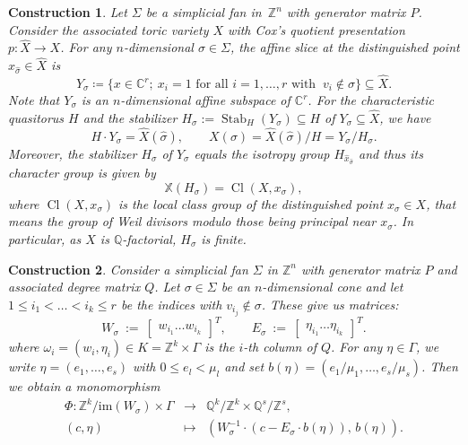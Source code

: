 \documentclass[10pt,a4paper]{amsart}
\newtheorem{construction}{Construction}
\newcommand{\C}{\mathbb{C}}
\DeclareMathOperator{\Cl}{Cl}
\newcommand{\Q}{\mathbb{Q}}
\DeclareMathOperator{\Stab}{Stab}
\newcommand{\Z}{\mathbb{Z}}
\begin{document}
\begin{construction}\label{constr:slice}
Let $\Sigma$ be a simplicial fan in~$\Z^n$ with generator
matrix $P$.
Consider the associated toric variety $X$ with Cox's quotient
presentation $p \colon \hat X \to X$.
For any $n$-dimensional $\sigma \in \Sigma$,
the \emph{affine slice} at the distinguished point
$\hat x_{\hat \sigma} \in \hat X$ is
$$
Y_\sigma
\coloneqq
\{ x \in \C^r; \ x_i=1 \text{ for all } i = 1, \ldots, r \text{ with } \  v_i \not\in \sigma \}
\subseteq
\hat X.
$$
Note that $Y_\sigma$ is an $n$-dimensional
affine subspace of $\C^r$.
For the characteristic quasitorus $H$ and the
\emph{stabilizer} $H_\sigma := \Stab_H(Y_\sigma) \subseteq H$
of $Y_\sigma \subseteq \hat X$, we have
$$
H \cdot Y_\sigma = \hat X(\hat\sigma),
\qquad
X(\sigma) = \hat X(\hat\sigma)/H = Y_\sigma/H_\sigma.
$$
Moreover, the stabilizer $H_\sigma$ of $Y_\sigma$
equals the isotropy group $H_{\hat x_{\hat \sigma}}$
and thus its character group is given by
$$
\mathbb{X}(H_\sigma) = \Cl(X,x_\sigma),
$$
where $\Cl(X,x_\sigma)$ is the local class group of the distinguished
point $x_\sigma \in X$, that means the group of Weil divisors
modulo those being principal near $x_\sigma$. In particular,
as $X$ is $\Q$-factorial, $H_\sigma$ is finite.
\end{construction}

\begin{construction}\label{constr:ev1}
Consider a simplicial fan $\Sigma$ in $\Z^n$ with generator
matrix $P$ and associated degree matrix $Q$.
Let $\sigma \in \Sigma$ be an $n$-dimensional cone
and let $1 \le i_1 < \ldots < i_k \le r$ be the
indices with $v_{i_j} \not \in \sigma$. These give
us matrices:
$$
W_\sigma \ := \ \begin{bmatrix} w_{i_1} \ldots w_{i_k} \end{bmatrix}^T,
\qquad
E_\sigma \ := \ \begin{bmatrix} \eta_{i_1} \ldots \eta_{i_k} \end{bmatrix}^T.
$$
where $\omega_i = (w_i,\eta_i) \in K = \Z^k \times \Gamma$ is the $i$-th column
of $Q$. For any $\eta \in \Gamma$, we write $\eta = (e_1, \ldots, e_s)$
with $0 \le e_l <  \mu_l$ and set $b(\eta) = (e_1/\mu_1,\ldots,e_s/\mu_s)$.
Then we obtain a monomorphism
$$
\begin{array}{rcl}
\Phi \colon \Z^k/\mathrm{im}(W_\sigma) \times \Gamma & \to & \Q^k/\Z^k \times \Q^s/\Z^s,
\\[5pt]                                                     
(c,\eta) & \mapsto & \left(W_\sigma^{-1} \cdot (c-E_\sigma \cdot b(\eta)), \, b(\eta) \right).
\end{array}
$$
\end{construction}
\end{document}

